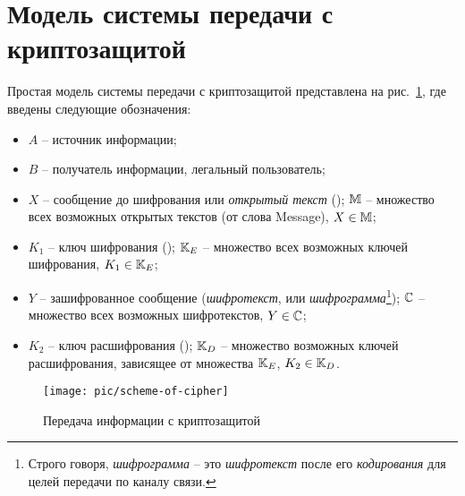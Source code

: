 \section{Модель системы передачи с криптозащитой}

Простая модель системы передачи с криптозащитой представлена на рис.~\ref{pic:Encrypt}, где введены следующие обозначения:
\begin{itemize}
    \item $A$ -- источник информации;
    \item $B$ -- получатель информации, легальный пользователь;
    \item $X$ -- сообщение до шифрования или \emph{открытый текст} (); $\mathbb{M}$ -- множество всех возможных открытых текстов (от слова Message), $X \in \mathbb{M}$;
    \item $K_1$ -- ключ шифрования (); $\mathbb{K}_E$ -- множество всех возможных ключей шифрования, $K_1 \in \mathbb{K}_E$;
    \item $Y$ -- зашифрованное сообщение (\emph{шифротекст},  или \emph{шифрограмма}\footnote{Строго говоря, \emph{шифрограмма} -- это \emph{шифротекст} после его \emph{кодирования} для целей передачи по каналу связи.}); $\mathbb{C}$ -- множество всех возможных шифротекстов, $Y \in \mathbb{C}$;
    \item $K_2$ -- ключ расшифрования (); $\mathbb{K}_D$  -- множество возможных ключей расшифрования, зависящее от множества $\mathbb{K}_E$, $K_2 \in \mathbb{K}_D$.
\end{itemize}

\begin{figure}[!thb]
	\centering
	\texttt{[image: pic/scheme-of-cipher]}
	\caption{Передача информации с криптозащитой\label{pic:Encrypt}}
\end{figure}

